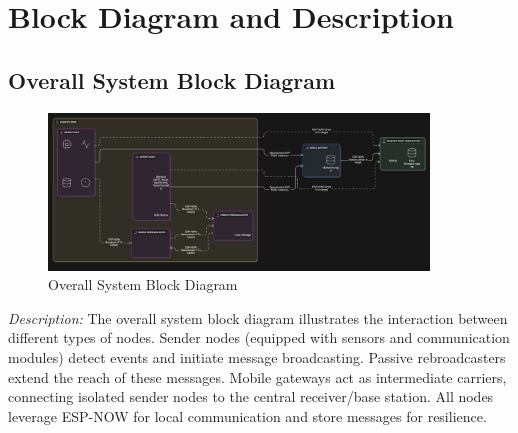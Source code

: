 \documentclass[12pt, a4paper]{article}
\begin{document}
\section{Block Diagram and Description} 
\subsection{Overall System Block Diagram}
\begin{figure}[htbp]
    \centering
    \includegraphics[width=0.9\textwidth]{image.jpg} %
    \caption{Overall System Block Diagram}
    \label{fig:system_block_diagram}
\end{figure}
\textit{Description:} The overall system block diagram illustrates the interaction between different types of nodes. Sender nodes (equipped with sensors and communication modules) detect events and initiate message broadcasting. Passive rebroadcasters extend the reach of these messages. Mobile gateways act as intermediate carriers, connecting isolated sender nodes to the central receiver/base station. All nodes leverage ESP-NOW for local communication and store messages for resilience.
\end{document}
